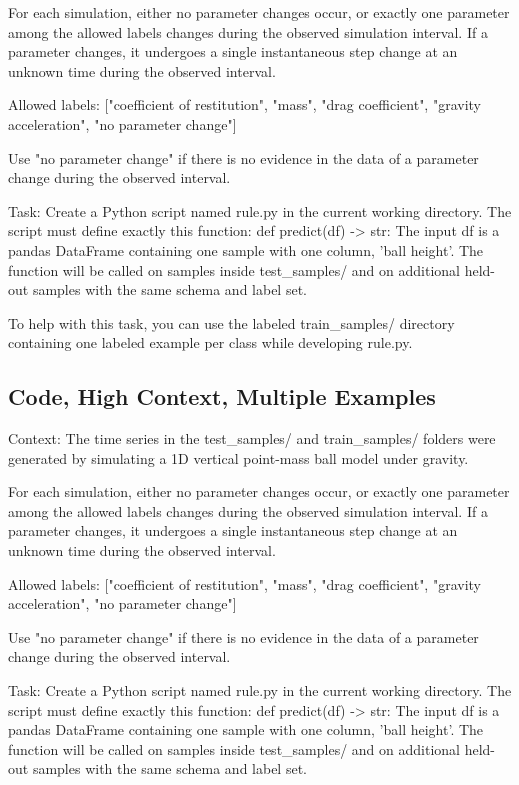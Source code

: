 \documentclass[11pt]{article}
\begin{document}
\begin{DocCode}
\begin{DocCode}
For each simulation, either no parameter changes occur, or exactly one parameter among the allowed labels changes during the observed simulation interval.
If a parameter changes, it undergoes a single instantaneous step change at an unknown time during the observed interval.

Allowed labels:
["coefficient of restitution", "mass", "drag coefficient", "gravity acceleration", "no parameter change"]

Use "no parameter change" if there is no evidence in the data of a parameter change during the observed interval.

Task:
Create a Python script named rule.py in the current working directory.
The script must define exactly this function:
def predict(df) -> str:
The input df is a pandas DataFrame containing one sample with one column, 'ball height'.
The function will be called on samples inside test_samples/ and on additional held-out samples with the same schema and label set.

To help with this task, you can use the labeled train_samples/ directory containing one labeled example per class while developing rule.py. 
\end{DocCode}

\subsection*{Code, High Context, Multiple Examples}
\begin{DocCode}
Context:
The time series in the test_samples/ and train_samples/ folders were generated by simulating a 1D vertical point-mass ball model under gravity.

For each simulation, either no parameter changes occur, or exactly one parameter among the allowed labels changes during the observed simulation interval.
If a parameter changes, it undergoes a single instantaneous step change at an unknown time during the observed interval.

Allowed labels:
["coefficient of restitution", "mass", "drag coefficient", "gravity acceleration", "no parameter change"]

Use "no parameter change" if there is no evidence in the data of a parameter change during the observed interval.

Task:
Create a Python script named rule.py in the current working directory.
The script must define exactly this function:
def predict(df) -> str:
The input df is a pandas DataFrame containing one sample with one column, 'ball height'.
The function will be called on samples inside test_samples/ and on additional held-out samples with the same schema and label set.


\end{DocCode}
\end{DocCode}
\end{document}
